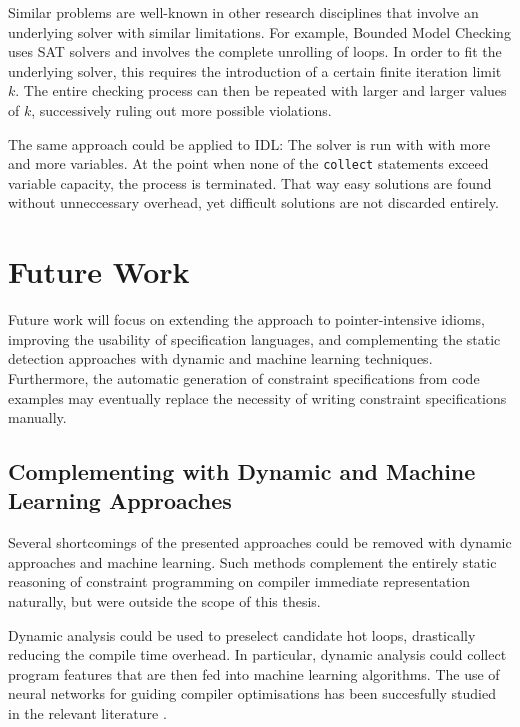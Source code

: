     Similar problems are well-known in other research disciplines that involve
    an underlying solver with similar limitations.
    For example, Bounded Model Checking \cite{Clarke:2001:BMC:510986.510987}
    uses SAT solvers and involves the complete unrolling of loops.
    In order to fit the underlying solver, this requires the introduction of a
    certain finite iteration limit $k$.
    The entire checking process can then be repeated with larger and larger
    values of $k$, successively ruling out more possible violations.

    The same approach could be applied to IDL: The solver is run with with more
    and more variables.
    At the point when none of the \texttt{collect} statements exceed variable
    capacity, the process is terminated.
    That way easy solutions are found without unneccessary overhead, yet
    difficult solutions are not discarded entirely.

\section{Future Work}

    Future work will focus on extending the approach to pointer-intensive
    idioms, improving the usability of specification languages, and
    complementing the static detection approaches with dynamic and
    machine learning techniques.
    Furthermore, the automatic generation of constraint specifications from
    code examples may eventually replace the necessity of writing constraint
    specifications manually.

\subsection*{Complementing with Dynamic and Machine Learning Approaches}

    Several shortcomings of the presented approaches could be removed with
    dynamic approaches and machine learning.
    Such methods complement the entirely static reasoning of constraint
    programming on compiler immediate representation naturally, but were
    outside the scope of this thesis.

    Dynamic analysis could be used to preselect candidate hot loops, drastically
    reducing the compile time overhead.
    In particular, dynamic analysis could collect program features that are
    then fed into machine learning algorithms.
    The use of neural networks for guiding compiler optimisations has been
    succesfully studied in the relevant literature
    \citep{DBLP:journals/pieee/WangO18}.

